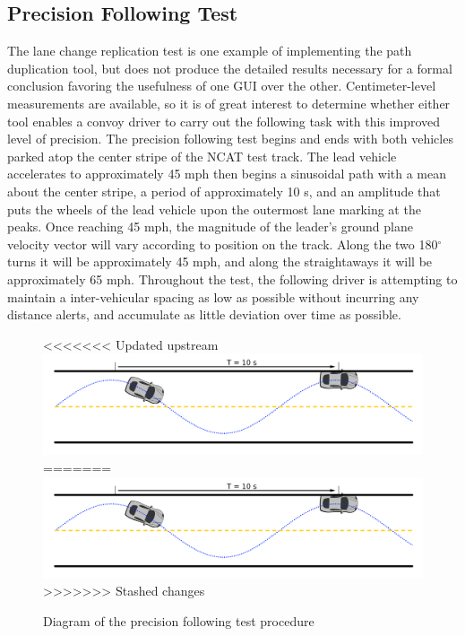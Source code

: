 \subsection{Precision Following Test} \label{sec:targetspacingtest}
The lane change replication test is one example of implementing the path duplication tool, but does not produce the detailed results necessary for a formal conclusion favoring the usefulness of one GUI over the other. Centimeter-level measurements are available, so it is of great interest to determine whether either tool enables a convoy driver to carry out the following task with this improved level of precision. The precision following test begins and ends with both vehicles parked atop the center stripe of the NCAT test track. The lead vehicle accelerates to approximately 45 mph then begins a sinusoidal path with a mean about the center stripe, a period of approximately 10 s, and an amplitude that puts the wheels of the lead vehicle upon the outermost lane marking at the peaks. Once reaching 45 mph, the magnitude of the leader's ground plane velocity vector will vary according to position on the track. Along the two 180$^\circ$ turns it will be approximately 45 mph, and along the straightaways it will be approximately 65 mph. Throughout the test, the following driver is attempting to maintain a inter-vehicular spacing as low as possible without incurring any distance alerts, and accumulate as little deviation over time as possible.

% 
\begin{figure}[ht] \centering
<<<<<<< Updated upstream
    \includegraphics[width=6.5in]{./figs/precision_following_diagram.png}
=======
    \includegraphics[width=6in]{./figs/precision_following_diagram.png}
>>>>>>> Stashed changes
    \caption{Diagram of the precision following test procedure} \label{fig:precisionfollowingdiagram}
\end{figure}

